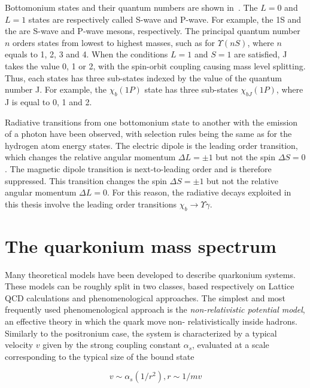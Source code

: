 



Bottomonium states and their quantum numbers are shown
in~. The $L = 0$ and $L = 1$ states are respectively
called S-wave and P-wave. For example, the \Y1S and the \chiboneOneP are S-wave and 
P-wave mesons, respectively. The principal quantum number $n$ orders states from lowest to highest
masses, such as for $\Upsilon(nS)$, where $n$ equals to 1, 2, 3 and 4. When the
conditions $L = 1$ and $S = 1$ are satisfied, J takes the value 0, 1 or 2, with the spin-orbit coupling 
causing mass level splitting. Thus,
each \chib states has three sub-states indexed by the value of the quantum
number J. For example, the $\chi_b(1P)$ state has three sub-states $\chi_{bJ}(1P)$,
where J is equal to 0, 1 and 2.

Radiative transitions from one bottomonium state to another with the emission of a photon 
have been observed, with selection rules being the same as for the hydrogen atom energy states. 
The electric dipole is the leading order transition, which changes the relative angular
momentum $\Delta L  = \pm 1$ but not the spin $\Delta S = 0$. The magnetic
dipole transition is next-to-leading order and is therefore suppressed. 
This transition changes the spin $\Delta S = \pm 1$ but not the relative
angular momentum $\Delta L = 0$. For this reason, the radiative decays exploited in 
this thesis involve the leading order transitions $\chi_b \rightarrow \Upsilon \gamma$. 

\section{The quarkonium mass spectrum}

Many theoretical models have been developed to describe quarkonium systems.
These models can be roughly split in two classes, based respectively on Lattice
QCD calculations and phenomenological approaches. The simplest and most
frequently used phenomenological approach is the {\it non-relativistic
potential model}, an effective theory in which the quark move non-
relativistically inside hadrons. Similarly to the positronium case, the system
is characterized by a typical velocity $v$ given by the strong coupling constant
$\alpha_s$, evaluated at a scale corresponding to the typical size of the bound
state

\begin{equation}
v \sim \alpha_s(1/r^2), r \sim 1/mv
\end{equation}

